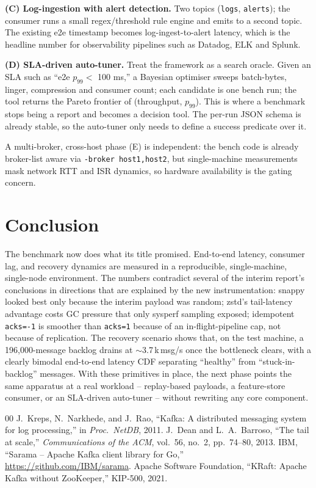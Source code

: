\documentclass[conference]{IEEEtran}
\begin{document}
\textbf{(C) Log-ingestion with alert detection.} Two topics
(\texttt{logs}, \texttt{alerts}); the consumer runs a small
regex/threshold rule engine and emits to a second topic. The
existing e2e timestamp becomes log-ingest-to-alert latency, which is
the headline number for observability pipelines such as Datadog,
ELK and Splunk.

\textbf{(D) SLA-driven auto-tuner.} Treat the framework as a search
oracle. Given an SLA such as ``e2e $p_{99} <$ 100 ms,'' a Bayesian
optimiser sweeps batch-bytes, linger, compression and consumer count;
each candidate is one bench run; the tool returns the Pareto frontier
of (throughput, $p_{99}$). This is where a benchmark stops being a
report and becomes a decision tool. The per-run JSON schema is
already stable, so the auto-tuner only needs to define a success
predicate over it.

A multi-broker, cross-host phase (E) is independent: the bench code is
already broker-list aware via \texttt{-broker host1,host2}, but
single-machine measurements mask network RTT and ISR dynamics, so
hardware availability is the gating concern.

\section{Conclusion}
The benchmark now does what its title promised. End-to-end latency,
consumer lag, and recovery dynamics are measured in a reproducible,
single-machine, single-node environment. The numbers contradict
several of the interim report's conclusions in directions that are
explained by the new instrumentation: snappy looked best only because
the interim payload was random; zstd's tail-latency advantage costs
GC pressure that only sysperf sampling exposed; idempotent
\texttt{acks=-1} is smoother than \texttt{acks=1} because of an
in-flight-pipeline cap, not because of replication. The recovery
scenario shows that, on the test machine, a 196{,}000-message backlog
drains at $\sim$3.7\,k\,msg/s once the bottleneck clears, with a
clearly bimodal end-to-end latency CDF separating ``healthy'' from
``stuck-in-backlog'' messages. With these primitives in place, the
next phase points the same apparatus at a real workload --
replay-based payloads, a feature-store consumer, or an SLA-driven
auto-tuner -- without rewriting any core component.

\begin{thebibliography}{00}
J.~Kreps, N.~Narkhede, and J.~Rao,
``Kafka: A distributed messaging system for log processing,''
in \emph{Proc.\ NetDB}, 2011.
J.~Dean and L.~A.~Barroso,
``The tail at scale,''
\emph{Communications of the ACM}, vol.\ 56, no.\ 2, pp.\ 74--80, 2013.
IBM, ``Sarama -- Apache Kafka client library for Go,''
\url{https://github.com/IBM/sarama}.
Apache Software Foundation,
``KRaft: Apache Kafka without ZooKeeper,''
KIP-500, 2021.

\end{thebibliography}
\end{document}
